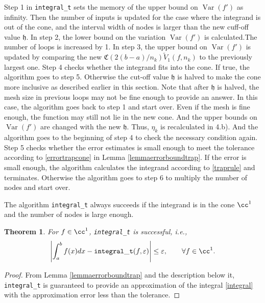 \documentclass{iitthesis}
\DeclareMathOperator{\Var}{Var}
\newtheorem{theorem}{Theorem}
\theoremstyle{definition}
\theoremstyle{remark}
\begin{document}
Step 1 in {\tt integral\_t} sets the memory of the upper bound on $\Var(f')$ as infinity. Then the number of inputs is updated for the case where the integrand is out of the cone, and the interval width of nodes is larger than the new cuff-off value $\mathfrak{h}$. In step 2, the lower bound on the variation $\Var(f')$ is calculated.The number of loops is increased by 1. In step 3, the upper bound on $\Var(f')$ is updated by comparing the new $\mathfrak{C}(2(b-a)/n_{k})\widetilde{V}_1(f,n_k)$ to the previously largest one. Step 4 checks whether the integrand fits into the cone. If true, the algorithm goes to step 5. Otherwise the cut-off value $\mathfrak{h}$ is halved to make the cone more inclusive as described earlier in this section. Note that after $\mathfrak{h}$ is halved, the mesh size in previous loops may not be fine enough to provide an answer. In this case, the algorithm goes back to step 1 and start over. Even if the mesh is fine enough, the function may still not lie in the new cone. And the upper bounds on $\Var(f')$ are changed with the new $\mathfrak{h}$. Thus, $\eta_{k}$ is recalculated in 4.b). And the algorithm goes to the beginning of step 4 to check the necessary condition again. Step 5 checks whether the error estimates is small enough to meet the tolerance according to \eqref{errortrapcone} in Lemma \ref{lemmaerrorboundtrap}. If the error is small enough, the algorithm calculates the integrand according to \eqref{traprule} and terminates. Otherwise the algorithm goes to step 6 to multiply the number of nodes and start over.

The algorithm {\tt integral\_t} always succeeds if the integrand is in the cone $\cc^1$ and the number of nodes is large enough.
\begin{theorem}\label{thmTrap}
    For $f \in \cc^1$, {\tt integral\_t} is successful, i.e.,
    \begin{equation*}
      \left|\int_{a}^{b}f(x)dx-{\tt integral\_t}(f,\varepsilon)\right|\le\varepsilon, \qquad \forall f\in \cc^1.
    \end{equation*}
\end{theorem}
\begin{proof}
  From Lemma \ref{lemmaerrorboundtrap} and the description below it, {\tt integral\_t} is guaranteed to provide an approximation of the integral \eqref{integral} with the approximation error less than the tolerance.
\end{proof}
\end{document}
